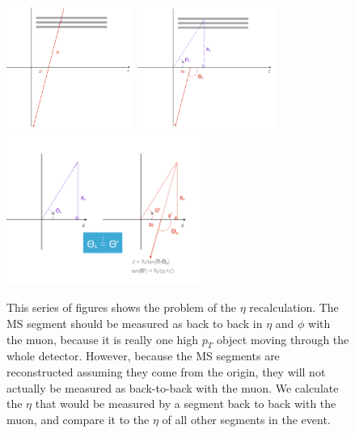 \begin{figure}[!ht]
\centering
\includegraphics[height=4cm]{figures/cosmics/eta_correction_1.png}
\includegraphics[height=4cm]{figures/cosmics/eta_correction_2.png}
\includegraphics[height=5cm]{figures/cosmics/eta_correction_3.png}
\caption{This series of figures shows the problem of the $\eta$ recalculation. The MS segment should be measured as back to back in $\eta$ and $\phi$ with the muon, because it is really one high $p_{T}$ object moving through the whole detector. However, because the MS segments are reconstructed assuming they come from the origin, they will not actually be measured as back-to-back with the muon. We calculate the $\eta$ that would be measured by a segment back to back with the muon, and compare it to the $\eta$ of all other segments in the event.}
\label{fig:cos_eta_recalculation}
\end{figure}

